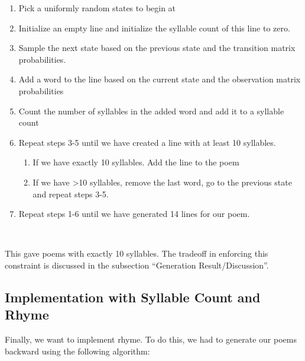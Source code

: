 \begin{enumerate}

\item Pick a uniformly random states to begin at

\item Initialize an empty line and initialize the syllable count of this line to zero.

\item Sample the next state based on the previous state and the transition matrix probabilities.

\item Add a word to the line based on the current state and the observation matrix probabilities

\item Count the number of syllables in the added word and add it to a syllable count

\item Repeat steps 3-5 until we have created a line with at least 10 syllables. 

\begin{enumerate}

\item If we have exactly 10 syllables. Add the line to the poem

\item If we have \textgreater 10 syllables, remove the last word, go to the previous state and repeat steps 3-5.

\end{enumerate}

\item Repeat steps 1-6 until we have generated 14 lines for our poem.

\end{enumerate}
~

This gave poems with exactly 10 syllables. The tradeoff in enforcing this constraint is discussed in the subsection ``Generation Result/Discussion''.

\subsection*{Implementation with Syllable Count and Rhyme}

Finally, we want to implement rhyme. To do this, we had to generate our poems backward using the following algorithm:

